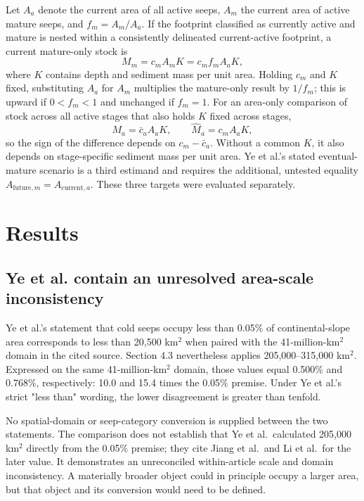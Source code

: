 \documentclass[11pt,letterpaper]{article}
\begin{document}
Let $A_a$ denote the current area of all active seeps, $A_m$ the current area of active mature seeps, and $f_m=A_m/A_a$. If the footprint classified as currently active and mature is nested within a consistently delineated current-active footprint, a current mature-only stock is
\begin{equation}
M_m=c_m A_m K=c_m f_m A_a K,
\end{equation}
where $K$ contains depth and sediment mass per unit area. Holding $c_m$ and $K$ fixed, substituting $A_a$ for $A_m$ multiplies the mature-only result by $1/f_m$; this is upward if $0<f_m<1$ and unchanged if $f_m=1$. For an area-only comparison of stock across all active stages that also holds $K$ fixed across stages,
\begin{equation}
M_a=\bar c_a A_a K,
\qquad
\widehat M_a=c_m A_a K,
\end{equation}
so the sign of the difference depends on $c_m-\bar c_a$. Without a common $K$, it also depends on stage-specific sediment mass per unit area. Ye et al.'s stated eventual-mature scenario is a third estimand and requires the additional, untested equality $A_{\mathrm{future},m}=A_{\mathrm{current},a}$. These three targets were evaluated separately.

\section{Results}

\subsection{Ye et al. contain an unresolved area-scale inconsistency}

Ye et al.'s statement that cold seeps occupy less than 0.05\% of continental-slope area corresponds to less than 20,500 km$^2$ when paired with the 41-million-km$^2$ domain in the cited source. Section 4.3 nevertheless applies 205,000--315,000 km$^2$. Expressed on the same 41-million-km$^2$ domain, those values equal 0.500\% and 0.768\%, respectively: 10.0 and 15.4 times the 0.05\% premise. Under Ye et al.'s strict "less than" wording, the lower disagreement is greater than tenfold.

No spatial-domain or seep-category conversion is supplied between the two statements. The comparison does not establish that Ye et al.\ calculated 205,000 km$^2$ directly from the 0.05\% premise; they cite Jiang et al.\ and Li et al.\ for the later value. It demonstrates an unreconciled within-article scale and domain inconsistency. A materially broader object could in principle occupy a larger area, but that object and its conversion would need to be defined.
\end{document}
